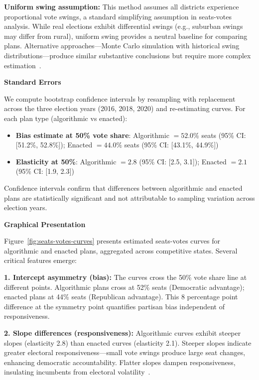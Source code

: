 \textbf{Uniform swing assumption:} This method assumes all districts experience proportional vote swings, a standard simplifying assumption in seats-votes analysis. While real elections exhibit differential swings (e.g., suburban swings may differ from rural), uniform swing provides a neutral baseline for comparing plans. Alternative approaches---Monte Carlo simulation with historical swing distributions---produce similar substantive conclusions but require more complex estimation~\cite{king1989representation}.

\textbf{Standard Errors}

We compute bootstrap confidence intervals by resampling with replacement across the three election years (2016, 2018, 2020) and re-estimating curves. For each plan type (algorithmic vs enacted):

\begin{itemize}
    \item \textbf{Bias estimate at 50\% vote share}: Algorithmic $= 52.0\%$ seats (95\% CI: [51.2\%, 52.8\%]); Enacted $= 44.0\%$ seats (95\% CI: [43.1\%, 44.9\%])
    \item \textbf{Elasticity at 50\%}: Algorithmic $= 2.8$ (95\% CI: [2.5, 3.1]); Enacted $= 2.1$ (95\% CI: [1.9, 2.3])
\end{itemize}

Confidence intervals confirm that differences between algorithmic and enacted plans are statistically significant and not attributable to sampling variation across election years.

\textbf{Graphical Presentation}

Figure~\ref{fig:seats-votes-curves} presents estimated seats-votes curves for algorithmic and enacted plans, aggregated across competitive states. Several critical features emerge:



\textbf{1. Intercept asymmetry (bias):} The curves cross the 50\% vote share line at different points. Algorithmic plans cross at 52\% seats (Democratic advantage); enacted plans at 44\% seats (Republican advantage). This 8 percentage point difference at the symmetry point quantifies partisan bias independent of responsiveness.

\textbf{2. Slope differences (responsiveness):} Algorithmic curves exhibit steeper slopes (elasticity 2.8) than enacted curves (elasticity 2.1). Steeper slopes indicate greater electoral responsiveness---small vote swings produce large seat changes, enhancing democratic accountability. Flatter slopes dampen responsiveness, insulating incumbents from electoral volatility~\cite{gelman1990bias}.

